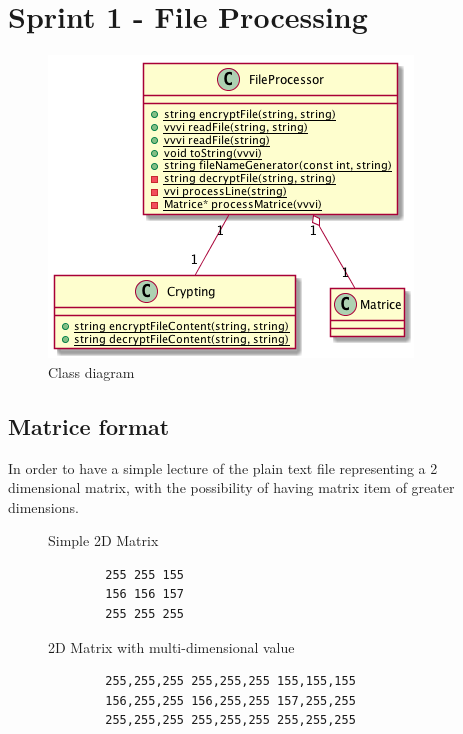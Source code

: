 \chapter{Sprint 1 - File Processing}

\begin{figure}[h]
    \begin{center}
        \includegraphics[scale=0.40]{./ressources/graph/FileProcessor.png}
    \end{center}
    \caption{Class diagram}
    \label{Solution - FileProcessing class diagram}
\end{figure}
\bigskip


\section{Matrice format}

In order to have a simple lecture of the plain text file representing a 2 dimensional matrix, with the possibility of
having matrix item of greater dimensions.

\begin{figure}[h]
	\begin{minipage}{0.25\textwidth}
	\flushleft
	Simple 2D Matrix
	\centering
		\begin{verbatim}
		255 255 155
		156 156 157
		255 255 255
		\end{verbatim}
	\end{minipage}
\hfill
\noindent
	\begin{minipage}{0.45\textwidth}
	\flushright
	2D Matrix with multi-dimensional value
		\centering
		\begin{verbatim}
		255,255,255 255,255,255 155,155,155
		156,255,255 156,255,255 157,255,255
		255,255,255 255,255,255 255,255,255
		\end{verbatim}
	\end{minipage}
\label{fig:Plain text matrix format}
\end{figure}


